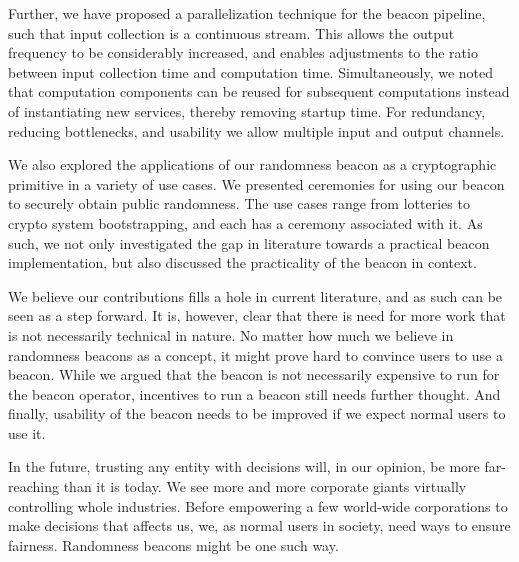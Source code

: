 Further, we have proposed a parallelization technique for the beacon pipeline, such that input collection is a continuous stream.
This allows the output frequency to be considerably increased, and enables adjustments to the ratio between input collection time and computation time.
Simultaneously, we noted that computation components can be reused for subsequent computations instead of instantiating new services, thereby removing startup time.
For redundancy, reducing bottlenecks, and usability we allow multiple input and output channels.

We also explored the applications of our randomness beacon as a cryptographic primitive in a variety of use cases.
We presented ceremonies for using our beacon to securely obtain public randomness.
The use cases range from lotteries to crypto system bootstrapping, and each has a ceremony associated with it.
As such, we not only investigated the gap in literature towards a practical beacon implementation, but also discussed the practicality of the beacon in context.

We believe our contributions fills a hole in current literature, and as such can be seen as a step forward.
It is, however, clear that there is need for more work that is not necessarily technical in nature.
No matter how much we believe in randomness beacons as a concept, it might prove hard to convince users to use a beacon.
While we argued that the beacon is not necessarily expensive to run for the beacon operator, incentives to run a beacon still needs further thought.
And finally, usability of the beacon needs to be improved if we expect normal users to use it.

In the future, trusting any entity with decisions will, in our opinion, be more far-reaching than it is today.
We see more and more corporate giants virtually controlling whole industries.
Before empowering a few world-wide corporations to make decisions that affects us, we, as normal users in society, need ways to ensure fairness.
Randomness beacons might be one such way.

